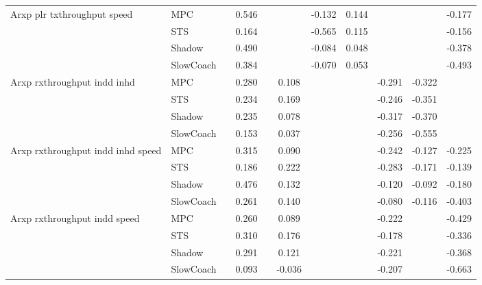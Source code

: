 \begin{tabular}{|l|l|*{9}{c|}}
\midrule
Arxp plr txthroughput speed    & MPC &       &     0.546 &        &     & -0.132 &  0.144 &      &      &   -0.177 \\
                              & STS &       &     0.164 &        &     & -0.565 &  0.115 &      &      &   -0.156 \\
                              & Shadow &       &     0.490 &        &     & -0.084 &  0.048 &      &      &   -0.378 \\
                              & SlowCoach &       &     0.384 &        &     & -0.070 &  0.053 &      &      &   -0.493 \\
\midrule
Arxp rxthroughput indd inhd    & MPC &       &     0.280 &        &  0.108 &     &     &  -0.291 &  -0.322 &       \\
                              & STS &       &     0.234 &        &  0.169 &     &     &  -0.246 &  -0.351 &       \\
                              & Shadow &       &     0.235 &        &  0.078 &     &     &  -0.317 &  -0.370 &       \\
                              & SlowCoach &       &     0.153 &        &  0.037 &     &     &  -0.256 &  -0.555 &       \\
\midrule
Arxp rxthroughput indd inhd speed    & MPC &       &     0.315 &        &  0.090 &     &     &  -0.242 &  -0.127 &   -0.225 \\
                              & STS &       &     0.186 &        &  0.222 &     &     &  -0.283 &  -0.171 &   -0.139 \\
                              & Shadow &       &     0.476 &        &  0.132 &     &     &  -0.120 &  -0.092 &   -0.180 \\
                              & SlowCoach &       &     0.261 &        &  0.140 &     &     &  -0.080 &  -0.116 &   -0.403 \\
\midrule
Arxp rxthroughput indd speed    & MPC &       &     0.260 &        &  0.089 &     &     &  -0.222 &      &   -0.429 \\
                              & STS &       &     0.310 &        &  0.176 &     &     &  -0.178 &      &   -0.336 \\
                              & Shadow &       &     0.291 &        &  0.121 &     &     &  -0.221 &      &   -0.368 \\
                              & SlowCoach &       &     0.093 &        & -0.036 &     &     &  -0.207 &      &   -0.663 \\

\end{tabular}
